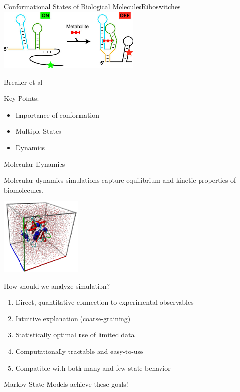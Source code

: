 \documentclass[10pt]{beamer}
\begin{document}
\begin{frame}{Conformational States of Biological Molecules}{Riboswitches}
\includegraphics[width=7.0cm]{Figures/Riboswitch.jpg}

\begin{tiny}
Breaker et al
\end{tiny}

\vfill

\begin{center}
 Key Points:
\end{center}


\begin{itemize}
 \item Importance of conformation
 \item Multiple States
 \item Dynamics
\end{itemize}
\end{frame}

\begin{frame}{Molecular Dynamics}
 
Molecular dynamics simulations capture equilibrium and kinetic properties of biomolecules.

\vfill

\includegraphics[width=40mm]{Figures/Box}

 
\end{frame}

\begin{frame}{How should we analyze simulation?}
 
 \begin{enumerate}
  \item Direct, quantitative connection to experimental observables
  \item Intuitive explanation (coarse-graining)
  \item Statistically optimal use of limited data
  \item Computationally tractable and easy-to-use
  \item Compatible with both many and few-state behavior
 \end{enumerate}

 \vfill
 
Markov State Models achieve these goals!
 
\end{frame}
\end{document}
